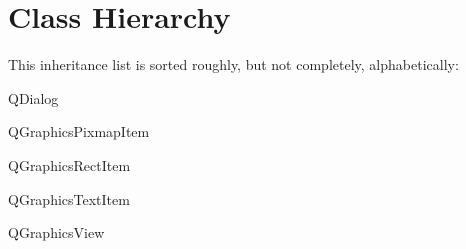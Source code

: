 \section{Class Hierarchy}
This inheritance list is sorted roughly, but not completely, alphabetically\+:\begin{DoxyCompactList}
\item {}
\item Q\+Dialog\begin{DoxyCompactList}
\item {}
\item {}
\item {}
\item {}
\end{DoxyCompactList}
\item Q\+Graphics\+Pixmap\+Item\begin{DoxyCompactList}
\item {}
\item {}
\item {}
\begin{DoxyCompactList}
\item {}
\item {}
\end{DoxyCompactList}
\end{DoxyCompactList}
\item Q\+Graphics\+Rect\+Item\begin{DoxyCompactList}
\item {}
\end{DoxyCompactList}
\item Q\+Graphics\+Text\+Item\begin{DoxyCompactList}
\item {}
\end{DoxyCompactList}
\item Q\+Graphics\+View\begin{DoxyCompactList}

\end{DoxyCompactList}
\end{DoxyCompactList}
